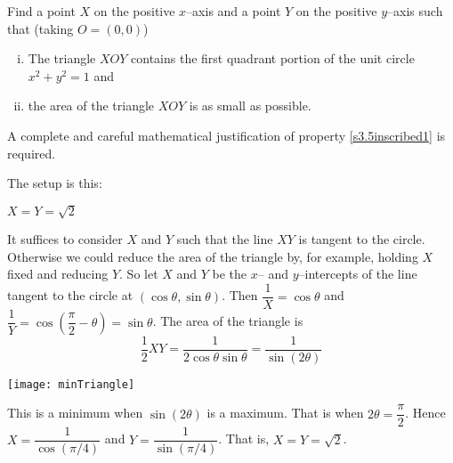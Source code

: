 \begin{question}[1998H]
Find a point $X$ on the positive $x$--axis and a point $Y$
on the positive $y$--axis such that (taking $O=(0,0)$)
\begin{enumerate}[(i)]
\item\label{s3.5inscribed1}The triangle $XOY$ contains the first quadrant portion of
the unit circle $x^2+y^2=1$ and
\item\label{s3.5inscribed2} the area of the triangle $XOY$ is as small as possible.
\end{enumerate}
A complete and careful mathematical justification of property \eqref{s3.5inscribed1}
is required.
\end{question}
\begin{hint}
The setup is this:
\begin{center}
\end{center}
\end{hint}
\begin{answer}
$X=Y=\sqrt{2}$
\end{answer}
\begin{solution}
 It suffices to consider $X$ and $Y$ such that the line $XY$
is tangent to the circle. Otherwise we could reduce the area of the triangle
by, for example, holding $X$ fixed and reducing $Y$. So let $X$ and $Y$
be the $x$-- and $y$--intercepts of the line tangent to the circle at
$(\cos\theta,\sin\theta)$. Then $\dfrac{1}{X}=\cos\theta$ and
$\dfrac{1}{Y}=\cos\left(\dfrac{\pi}{2}-\theta\right)
=\sin\theta$. The area of the triangle is
$$
\dfrac{1}{2} XY=\dfrac{1}{2\cos\theta\sin\theta}=\dfrac{1}{\sin(2\theta)}
$$

 \begin{center}
\texttt{[image: minTriangle]}
\end{center}


This is a minimum when $\sin(2\theta)$ is a maximum. That is when
$2\theta=\dfrac{\pi}{2}$. Hence $X=\dfrac{1}{\cos(\pi/4)}$ and
$Y=\dfrac{1}{\sin(\pi/4)}$. That is, $X=Y=\sqrt{2}$.

\end{solution}



